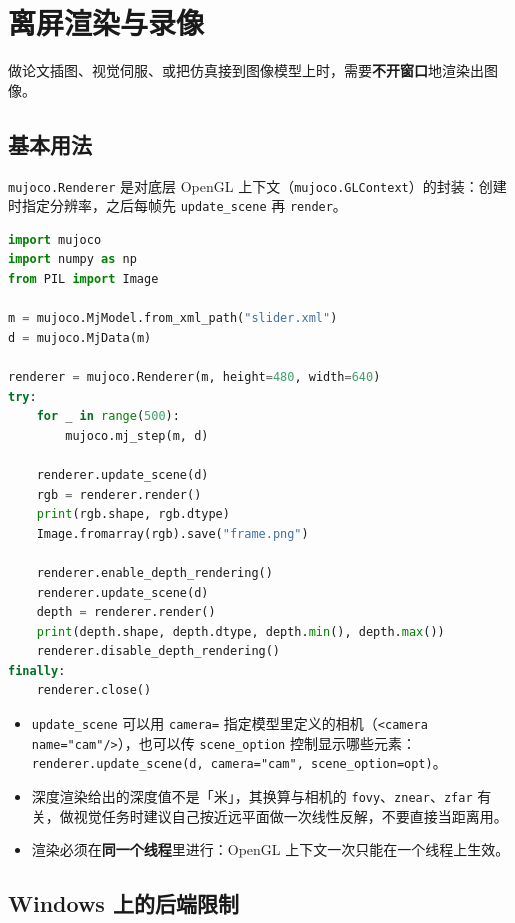 \section{离屏渲染与录像}

做论文插图、视觉伺服、或把仿真接到图像模型上时，需要\textbf{不开窗口}地渲染出图像。

\subsection{基本用法}

\texttt{mujoco.Renderer} 是对底层 OpenGL 上下文（\texttt{mujoco.GLContext}）的封装：创建时指定分辨率，之后每帧先 \texttt{update\_scene} 再 \texttt{render}。

\begin{lstlisting}[style=code, language=Python]
import mujoco
import numpy as np
from PIL import Image

m = mujoco.MjModel.from_xml_path("slider.xml")
d = mujoco.MjData(m)

renderer = mujoco.Renderer(m, height=480, width=640)
try:
    for _ in range(500):
        mujoco.mj_step(m, d)

    renderer.update_scene(d)
    rgb = renderer.render()
    print(rgb.shape, rgb.dtype)
    Image.fromarray(rgb).save("frame.png")

    renderer.enable_depth_rendering()
    renderer.update_scene(d)
    depth = renderer.render()
    print(depth.shape, depth.dtype, depth.min(), depth.max())
    renderer.disable_depth_rendering()
finally:
    renderer.close()
\end{lstlisting}

\begin{itemize}
	\item \texttt{update\_scene} 可以用 \texttt{camera=} 指定模型里定义的相机（\texttt{<camera name="cam"/>}），也可以传 \texttt{scene\_option} 控制显示哪些元素：
	      \texttt{renderer.update\_scene(d, camera="cam", scene\_option=opt)}。
	\item 深度渲染给出的深度值不是「米」，其换算与相机的 \texttt{fovy}、\texttt{znear}、\texttt{zfar} 有关，做视觉任务时建议自己按近远平面做一次线性反解，不要直接当距离用。
	\item 渲染必须在\textbf{同一个线程}里进行：OpenGL 上下文一次只能在一个线程上生效。
\end{itemize}

\subsection{Windows 上的后端限制}

